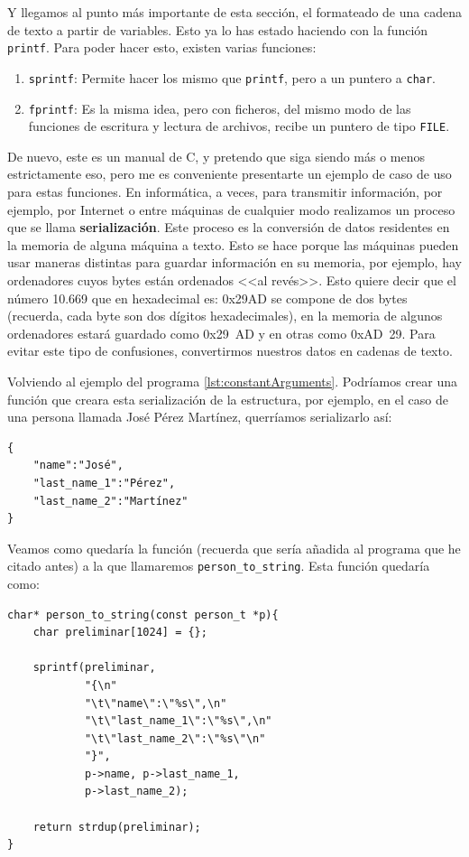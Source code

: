 \documentclass[a4paper]{article}
\begin{document}
Y llegamos al punto más importante de esta sección, el formateado de una cadena
de texto a partir de variables. Esto ya lo has estado haciendo con la función
\verb!printf!. Para poder hacer esto, existen varias funciones:
\begin{enumerate}
\item \verb!sprintf!: Permite hacer los mismo que \verb!printf!, pero a un
puntero a \verb!char!.
\item \verb!fprintf!: Es la misma idea, pero con ficheros, del mismo modo de
las funciones de escritura y lectura de archivos, recibe un puntero de tipo
\verb!FILE!.
\end{enumerate}

De nuevo, este es un manual de C, y pretendo que siga siendo más o menos
estrictamente eso, pero me es conveniente presentarte un ejemplo de caso de uso
para estas funciones. En informática, a veces, para transmitir información,
por ejemplo, por Internet o entre máquinas de cualquier modo realizamos un
proceso que se llama \textbf{serialización}. Este proceso es la conversión de
datos residentes en la memoria de alguna máquina a texto. Esto se hace porque
las máquinas pueden usar maneras distintas para guardar información en su
memoria, por ejemplo, hay ordenadores cuyos bytes están ordenados <<al revés>>.
Esto quiere decir que el número 10.669 que en hexadecimal es:
0x29AD se compone de dos bytes (recuerda, cada byte son dos dígitos
hexadecimales), en la memoria de algunos ordenadores estará guardado como
0x29~AD y en otras como 0xAD~29. Para evitar este tipo
de confusiones, convertirmos nuestros datos en cadenas de texto.

Volviendo al ejemplo del programa \ref{lst:constantArguments}. Podríamos
crear una función que creara esta serialización de la estructura, por ejemplo,
en el caso de una persona llamada José Pérez Martínez, querríamos serializarlo
así:

\begin{verbatim}
{
    "name":"José",
    "last_name_1":"Pérez",
    "last_name_2":"Martínez"
}
\end{verbatim}

Veamos como quedaría la función (recuerda que sería añadida al programa
que he citado antes) a la que llamaremos \verb!person_to_string!. Esta función
quedaría como:

\noindent
\begin{minipage}[H]{\linewidth}
\mbox{}
\begin{lstlisting}[style=C,
caption={Ejemplo básico de \texttt{sprintf}},
label={lst:sprintfExample}]
char* person_to_string(const person_t *p){
    char preliminar[1024] = {};

    sprintf(preliminar,
            "{\n"
            "\t\"name\":\"%s\",\n"
            "\t\"last_name_1\":\"%s\",\n"
            "\t\"last_name_2\":\"%s\"\n"
            "}",
            p->name, p->last_name_1,
            p->last_name_2);

    return strdup(preliminar);
}
\end{lstlisting}
\end{minipage}
\end{document}

